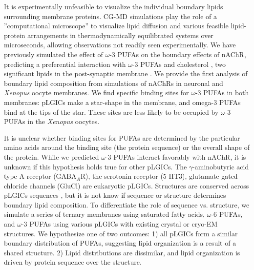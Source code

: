 \documentclass[9pt]{extarticle} %
\begin{document}
It is experimentally unfeasible to visualize the individual boundary lipids surrounding membrane proteins. CG-MD simulations play the role of a ”computational microscope” to visualize lipid diffusion and various feasible lipid-protein arrangements in thermodynamically equilibrated systems over microseconds, allowing observations not readily seen experimentally. We have previously simulated the effect of $\omega$-3 PUFAs on the boundary effects of nAChR, predicting a preferential interaction with $\omega$-3 PUFAs and cholesterol \cite{Sharp2019,Woods2019}, two significant lipids in the post-synaptic membrane \cite{Taguchi2010,Isolated1969,Breckenridge1973}. We provide the first analysis of boundary lipid composition from simulations of nAChRs in neuronal and \textit{Xenopus} oocyte membranes. We find specific binding sites for $\omega$-3 PUFAs  in both membranes: pLGICs make a star-shape in the membrane, and omega-3 PUFAs bind at the tips of the star.  These sites are less likely to be occupied by $\omega$-3 PUFAs in the \textit{Xenopus} oocytes. 


It is unclear whether binding sites for PUFAs are determined by the particular amino acids around the binding site (the protein sequence) or the overall shape of the protein. While we predicted $\omega$-3 PUFAs interact favorably with nAChR, it is unknown if this hypothesis holds true for other pLGICs. The $\gamma$-aminobutyric acid type A receptor (GABA$_A$R), the serotonin receptor (5-HT3),  glutamate-gated chloride channels (GluCl) are eukaryotic pLGICs. Structures are conserved across pLGICs sequences \cite{Jaiteh2016}, but it is not know if sequence or structure determines boundary lipid composition. To differentiate the role of sequence vs. structure, we simulate a series of ternary membranes using saturated fatty acids,  $\omega$-6 PUFAs, and  $\omega$-3 PUFAs using various pLGICs with existing crystal or cryo-EM structures. We hypothesize one of two outcomes: 1) all pLGICs form a similar boundary distribution of PUFAs, suggesting lipid organization is a result of a shared structure. 2) Lipid distributions are dissimilar, and lipid organization is driven by protein sequence over the structure.
\end{document}

